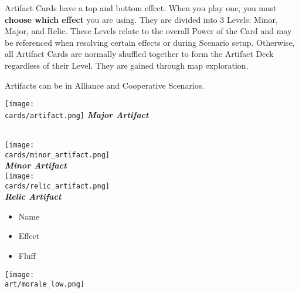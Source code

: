 \begin{multicols*}{2}
Artifact Cards have a top and bottom effect. When you play one, you must \textbf{choose which effect} you are using.
They are divided into 3 Levels: Minor, Major, and Relic.
These Levels relate to the overall Power of the Card and may be referenced when resolving certain effects or during Scenario setup.
Otherwise, all Artifact Cards are normally shuffled together to form the Artifact Deck regardless of their Level.
They are gained through map exploration.\par
Artifacts can be  in Alliance and Cooperative Scenarios.\par
\begin{multicols*}{2}
  \texttt{[image: \\cards/artifact.png]}
  \footnotesize
    \null\hfill\textbf{\textit{\textcolor{darkcandyapplered}{Major Artifact}}}
  \columnbreak
  \begin{center}
    \phantom{\ldots}\\
    \phantom{\ldots}\texttt{[image: \\cards/minor\_artifact.png]}\\
    \phantom{\ldots}\textbf{\textit{\textcolor{darkcandyapplered}{Minor Artifact}}}\\
    \vspace{3em}
    \phantom{\ldots}\texttt{[image: \\cards/relic\_artifact.png]}\\
    \phantom{\ldots}\textbf{\textit{\textcolor{darkcandyapplered}{Relic Artifact}}}
  \end{center}
\end{multicols*}
\begin{multicols}{2}
  \footnotesize
  \begin{itemize}
    \item[\textbf{1.}] Name
    \item[\textbf{2.}] Effect
    \columnbreak
    \item[\textbf{3.}] Fluff
  \end{itemize}
\end{multicols}

\vspace*{\fill}
\texttt{[image: \\art/morale\_low.png]}

\filbreak

\subsection*{}


\end{multicols*}
